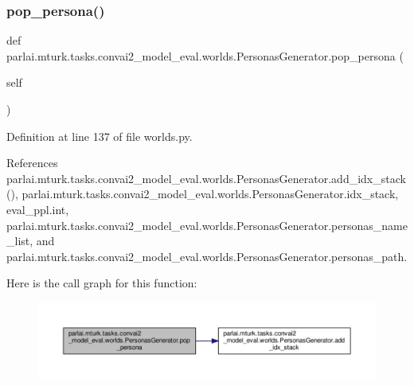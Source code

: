 \subsubsection{\texorpdfstring{pop\+\_\+persona()}{pop\_persona()}}
{\footnotesize\ttfamily def parlai.\+mturk.\+tasks.\+convai2\+\_\+model\+\_\+eval.\+worlds.\+Personas\+Generator.\+pop\+\_\+persona (\begin{DoxyParamCaption}\item[{}]{self }\end{DoxyParamCaption})}



Definition at line 137 of file worlds.\+py.



References parlai.\+mturk.\+tasks.\+convai2\+\_\+model\+\_\+eval.\+worlds.\+Personas\+Generator.\+add\+\_\+idx\+\_\+stack(), parlai.\+mturk.\+tasks.\+convai2\+\_\+model\+\_\+eval.\+worlds.\+Personas\+Generator.\+idx\+\_\+stack, eval\+\_\+ppl.\+int, parlai.\+mturk.\+tasks.\+convai2\+\_\+model\+\_\+eval.\+worlds.\+Personas\+Generator.\+personas\+\_\+name\+\_\+list, and parlai.\+mturk.\+tasks.\+convai2\+\_\+model\+\_\+eval.\+worlds.\+Personas\+Generator.\+personas\+\_\+path.

Here is the call graph for this function\+:
\nopagebreak
\begin{figure}[H]
\begin{center}
\leavevmode
\includegraphics[width=350pt]{classparlai_1_1mturk_1_1tasks_1_1convai2__model__eval_1_1worlds_1_1PersonasGenerator_aaed4bad803d218c5a11ffabae4fd4e66_cgraph}
\end{center}
\end{figure}
\mbox{\label{classparlai_1_1mturk_1_1tasks_1_1convai2__model__eval_1_1worlds_1_1PersonasGenerator_a56726b1b104cbb5ab96a545fd64a917f}} 
